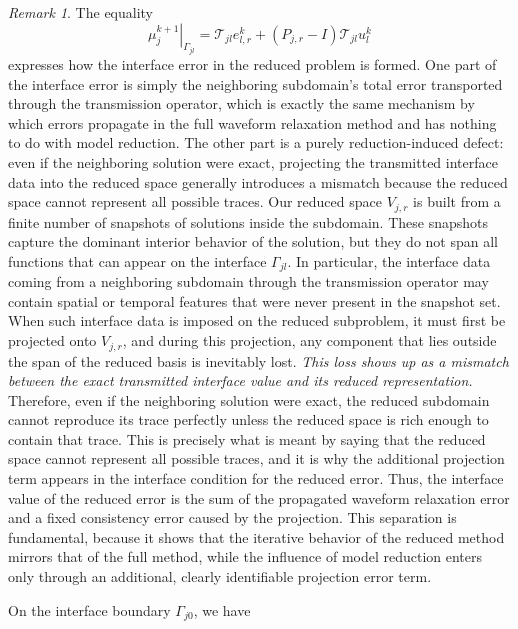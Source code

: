 \documentclass[a4paper, 11pt]{article}
\theoremstyle{plain}
\theoremstyle{definition}
\theoremstyle{remark}
\newtheorem{remark}[equation]{Remark}
\begin{document}
\begin{remark}
    The equality
    \begin{equation*}
        \left.\mu_{j}^{k+1}\right|_{\Gamma_{jl}} = \mathcal{T}_{jl}e_{l, r}^{k} + \left(P_{j, r} -I \right)\mathcal{T}_{jl}u_{l}^{k}
    \end{equation*}
    expresses how the interface error in the reduced problem is formed. One part of the interface error is simply the neighboring subdomain’s total error transported through the transmission operator, which is exactly the same mechanism by which errors propagate in the full waveform relaxation method and has nothing to do with model reduction. The other part is a purely reduction-induced defect: even if the neighboring solution were exact, projecting the transmitted interface data into the reduced space generally introduces a mismatch because the reduced space cannot represent all possible traces. Our reduced space $V_{j, r}$ is built from a finite number of snapshots of solutions inside the subdomain. These snapshots capture the dominant interior behavior of the solution, but they do not span all functions that can appear on the interface $\Gamma_{jl}$. In particular, the interface data coming from a neighboring subdomain through the transmission operator may contain spatial or temporal features that were never present in the snapshot set. When such interface data is imposed on the reduced subproblem, it must first be projected onto $V_{j, r}$, and during this projection, any component that lies outside the span of the reduced basis is inevitably lost. \textit{This loss shows up as a mismatch between the exact transmitted interface value and its reduced representation.} Therefore, even if the neighboring solution were exact, the reduced subdomain cannot reproduce its trace perfectly unless the reduced space is rich enough to contain that trace. This is precisely what is meant by saying that the reduced space cannot represent all possible traces, and it is why the additional projection term appears in the interface condition for the reduced error. Thus, the interface value of the reduced error is the sum of the propagated waveform relaxation error and a fixed consistency error caused by the projection. This separation is fundamental, because it shows that the iterative behavior of the reduced method mirrors that of the full method, while the influence of model reduction enters only through an additional, clearly identifiable projection error term.
\end{remark}
\noindent On the interface boundary $\Gamma_{j0}$, we have
\end{document}

